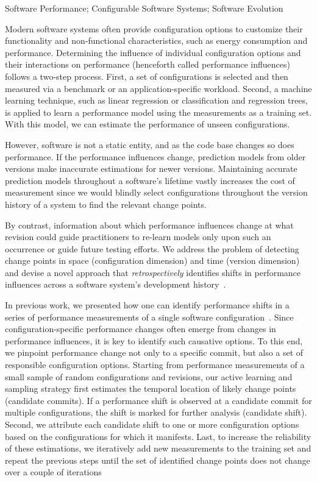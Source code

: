 \documentclass[utf8,biblatex]{lni}
\begin{document}
\begin{keywords}
Software Performance; 
Configurable Software Systems; 
Software Evolution
\end{keywords}

Modern software systems often provide configuration options to customize their functionality and non-functional characteristics, such as energy consumption and performance. Determining the influence of individual configuration options and their interactions on performance (henceforth called performance influences) follows a two-step process. First, a set of configurations is selected and then measured via a benchmark or an application-specific workload. Second, a machine learning technique, such as linear regression or classification and regression trees, is applied to learn a performance model using the measurements as a training set. With this model, we can estimate the performance of unseen configurations.%

However, software is not a static entity, and as the code base changes so does performance. If the performance influences change, prediction models from older versions make inaccurate estimations for newer versions. Maintaining accurate prediction models throughout a software’s lifetime vastly increases the cost of measurement since we would blindly select configurations throughout the version history of a system to find the relevant change points.

By contrast, information about which performance influences change at what revision could guide practitioners to re-learn models only upon such an occurrence or guide future testing efforts. We address the problem of detecting change points in space (configuration dimension) and time (version dimension) and devise a novel approach that \textit{retrospectively} identifies shifts in performance influences across a software system's development history~\cite{muehlbauer_identifying_2020}. 

In previous work, we presented how one can identify performance shifts in a series of performance measurements of a single software configuration~\cite{muhlbauer_accurate_2019}. Since configuration-specific performance changes often emerge from changes in performance influences, it is key to identify such causative options. To this end, we pinpoint performance change not only to a specific commit, but also a set of responsible configuration options. Starting from performance measurements of a small sample of random configurations and revisions, our active learning and sampling strategy first estimates the temporal location of likely change points (candidate commits). If a performance shift is observed at a candidate commit for multiple configurations, the shift is marked for further analysis (candidate shift). Second, we attribute each candidate shift to one or more configuration options based on the configurations for which it manifests. Last, to increase the reliability of these estimations, we iteratively add new measurements to the training set and repeat the previous steps until the set of identified change points does not change over a couple of iterations
\end{document}

